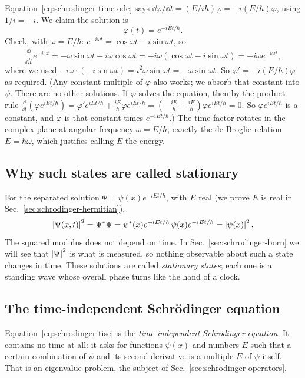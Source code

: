 Equation~\eqref{eq:schrodinger-time-ode} says $\dd\varphi/\dd t=(E/i\hbar)\varphi=-i(E/\hbar)\varphi$, using $1/i=-i$. We claim the solution is
\begin{equation}
\varphi(t)=e^{-iEt/\hbar}.
\label{eq:schrodinger-timefactor}
\end{equation}
Check, with $\omega=E/\hbar$: $e^{-i\omega t}=\cos\omega t-i\sin\omega t$, so
\[
\frac{\dd}{\dd t}e^{-i\omega t}=-\omega\sin\omega t-i\omega\cos\omega t=-i\omega(\cos\omega t-i\sin\omega t)=-i\omega e^{-i\omega t},
\]
where we used $-i\omega\cdot(-i\sin\omega t)=i^2\omega\sin\omega t=-\omega\sin\omega t$. So $\varphi'=-i(E/\hbar)\varphi$ as required. (Any constant multiple of $\varphi$ also works; we absorb that constant into $\psi$. There are no other solutions. If $\varphi$ solves the equation, then by the product rule $\frac{\dd}{\dd t}\left(\varphi e^{iEt/\hbar}\right)=\varphi'e^{iEt/\hbar}+\frac{iE}{\hbar}\varphi e^{iEt/\hbar}=\left(-\frac{iE}{\hbar}+\frac{iE}{\hbar}\right)\varphi e^{iEt/\hbar}=0$. So $\varphi e^{iEt/\hbar}$ is a constant, and $\varphi$ is that constant times $e^{-iEt/\hbar}$.) The time factor rotates in the complex plane at angular frequency $\omega=E/\hbar$, exactly the de Broglie relation $E=\hbar\omega$, which justifies calling $E$ the energy.

\subsection{Why such states are called stationary}

For the separated solution $\Psi=\psi(x)e^{-iEt/\hbar}$, with $E$ real (we prove $E$ is real in Sec.~\ref{sec:schrodinger-hermitian}),
\begin{equation}
\left\lvert \Psi(x,t)\right\rvert^2=\Psi^*\Psi=\psi^*(x)e^{+iEt/\hbar}\,\psi(x)e^{-iEt/\hbar}=\left\lvert \psi(x)\right\rvert^2.
\end{equation}
The squared modulus does not depend on time. In Sec.~\ref{sec:schrodinger-born} we will see that $\left\lvert \Psi\right\rvert^2$ is what is measured, so nothing observable about such a state changes in time. These solutions are called \emph{stationary states}; each one is a standing wave whose overall phase turns like the hand of a clock.

\subsection{The time-independent Schr\"odinger equation}

Equation~\eqref{eq:schrodinger-tise} is the \emph{time-independent Schr\"odinger equation}. It contains no time at all: it asks for functions $\psi(x)$ and numbers $E$ such that a certain combination of $\psi$ and its second derivative is a multiple $E$ of $\psi$ itself. That is an eigenvalue problem, the subject of Sec.~\ref{sec:schrodinger-operators}.

